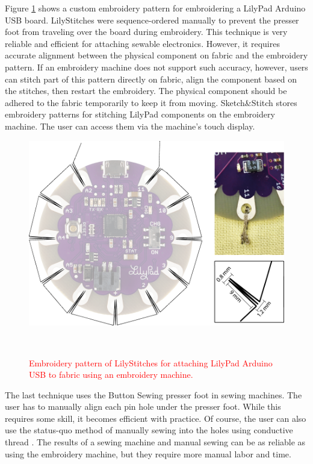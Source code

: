 \documentclass[header.tex]{subfiles}
\begin{document}
Figure \ref{fig:LilyStitch} shows a custom embroidery pattern for embroidering a LilyPad Arduino USB board. LilyStitches were sequence-ordered manually to prevent the presser foot from traveling over the board during embroidery. This technique is very reliable and efficient for attaching sewable electronics. However, it requires accurate alignment between the physical component on fabric and the embroidery pattern. If an embroidery machine does not support such accuracy, however, users can stitch part of this pattern directly on fabric, align the component based on the stitches, then restart the embroidery. The physical component should be adhered to the fabric temporarily to keep it from moving. Sketch\&Stitch stores embroidery patterns for stitching LilyPad components on the embroidery machine. The user can access them via the machine's touch display.

\begin{figure}
\centering
  \includegraphics[width=0.8\columnwidth]{figures/LilyStitch}
  \caption{\textcolor{red}{Embroidery pattern of LilyStitches for attaching LilyPad Arduino USB to fabric using an embroidery machine.}}~\label{fig:LilyStitch}
  \vspace{-2em}
\end{figure}

The last technique uses the Button Sewing presser foot in sewing machines. The user has to manually align each pin hole under the presser foot. While this requires some skill, it becomes efficient with practice. Of course, the user can also use the status-quo method of manually sewing into the holes using conductive thread \cite{Buechley:2008:LAU:1357054.1357123}. 
The results of a sewing machine and manual sewing can be as reliable as using the embroidery machine, but they require more manual labor and time.
\end{document}
